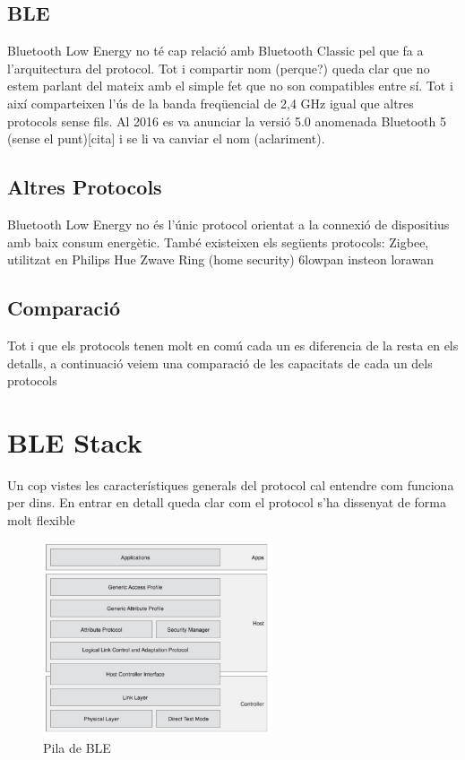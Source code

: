 \subsection{BLE}
Bluetooth Low Energy no té cap relació amb Bluetooth Classic pel que fa a l'arquitectura del protocol. Tot i compartir nom (perque?) queda clar que no estem parlant del mateix amb el simple fet que no son compatibles entre sí. Tot i així comparteixen l'ús de la banda freqüencial de 2,4 GHz igual que altres protocols sense fils. Al 2016 es va anunciar la versió 5.0 anomenada Bluetooth 5 (sense el punt)[cita] i se li va canviar el nom (aclariment).


\subsection{Altres Protocols}
Bluetooth Low Energy no és l'únic protocol orientat a la connexió de dispositius amb baix consum energètic. També existeixen els següents protocols:
Zigbee, utilitzat en Philips Hue
Zwave Ring (home security)
6lowpan
insteon
lorawan


\subsection{Comparació}
Tot i que els protocols tenen molt en comú cada un es diferencia de la resta en els detalls, a continuació veiem una comparació de les capacitats de cada un dels protocols

\section{BLE Stack}
Un cop vistes les característiques generals del protocol cal entendre com funciona per dins.
En entrar en detall queda clar com el protocol s'ha dissenyat de forma molt flexible 

\begin{figure}[h!]
	\begin{center}
		\includegraphics[width=0.6\textwidth]{./images/BLE_Stack.png}
		\caption{Pila de BLE \cite{ble_stack}}
		\label{ble_stack}
	\end{center}
\end{figure}

